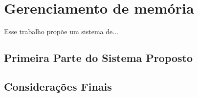 \chapter{Gerenciamento de memória}\label{cap:GerenciamentoMemoria}

Esse trabalho propõe um sistema de... 


\section{Primeira Parte do Sistema Proposto}



\section{Considerações Finais}


